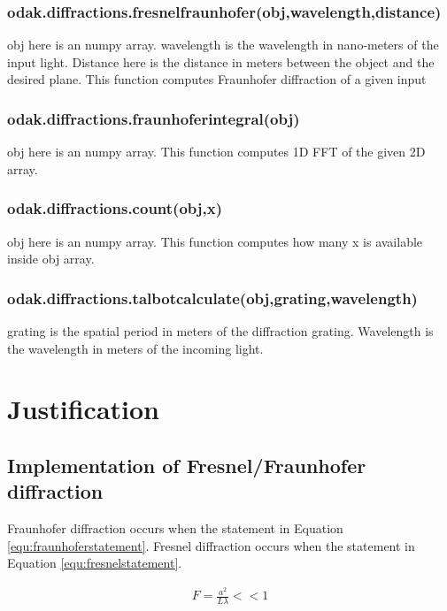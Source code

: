 \documentclass[journal,9pt]{IEEEtran}
\begin{document}
\subsubsection{odak.diffractions.fresnelfraunhofer(obj,wavelength,distance)}
obj here is an numpy array. wavelength is the wavelength in nano-meters of the input light. Distance here is the distance in meters between the object and the desired plane. This function computes Fraunhofer diffraction of a given input\\
\subsubsection{odak.diffractions.fraunhoferintegral(obj)}
obj here is an numpy array. This function computes 1D FFT of the given 2D array. \\
\subsubsection{odak.diffractions.count(obj,x)}
obj here is an numpy array. This function computes how many x is available inside obj array. \\
\subsubsection{odak.diffractions.talbotcalculate(obj,grating,wavelength)}
grating is the spatial period in meters of the diffraction grating. Wavelength is the wavelength in meters of the incoming light. \\

\section{Justification}
\label{section:justification}

\subsection{Implementation of Fresnel/Fraunhofer diffraction}

Fraunhofer diffraction occurs when the statement in Equation \ref{equ:fraunhoferstatement}. Fresnel diffraction occurs when the statement in Equation \ref{equ:fresnelstatement}.

\begin{equation}
\label{equ:fraunhoferstatement}
\begin{split}
F=\frac{a^2}{L \lambda}<<1
\end{split}
\end{equation}
\end{document}

